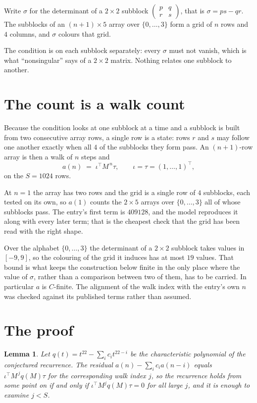 \documentclass[11pt,a4paper]{article}
\theoremstyle{plain}
\newtheorem{lemma}[theorem]{Lemma}
\theoremstyle{definition}
\begin{document}
Write $\sigma$ for the determinant of a $2\times2$ subblock
$\begin{pmatrix}p&q\\r&s\end{pmatrix}$, that is $\sigma=ps-qr$. The subblocks of an
$(n+1)\times5$ array over $\{0,\dots,3\}$ form a grid of $n$ rows and $4$
columns, and $\sigma$ colours that grid.

The condition is on each subblock separately: every $\sigma$ must not vanish, which is what
``nonsingular'' says of a $2\times2$ matrix. Nothing
relates one subblock to another.

\section{The count is a walk count}

Because the condition looks at one subblock at a time and a subblock is
built from two consecutive array rows, a single row is a state: rows $r$ and $s$ may follow one
another exactly when all $4$ of the subblocks they form pass. An $(n+1)$-row array is then a
walk of $n$ steps and
\[
a(n)\;=\;\iota^{\!\top}M^{\,n}\tau,\qquad\iota=\tau=(1,\dots,1)^{\!\top},
\]
on the $S=1024$ rows.

At $n=1$ the array has two rows and the grid is a single row of $4$
subblocks, each tested on its own, so $a(1)$ counts the
$2\times5$ arrays over $\{0,\dots,3\}$ all of whose subblocks pass. The entry's
first term is $409128$, and the model reproduces it along with every later term; that is the
cheapest check that the grid has been read with the right shape.

Over the alphabet $\{0,\dots,3\}$ the determinant of a $2\times2$ subblock takes values in
$[-9,9]$, so the colouring of the grid it induces has at most $19$ values.
That bound is what keeps the construction below finite in the only place where the value of
$\sigma$, rather than a comparison between two of them, has to be carried.
In particular $a$ is $C$-finite. The alignment of the walk index with the entry's own $n$ was
checked against its published terms rather than assumed.

\section{The proof}

\begin{lemma}\label{lem:crit}
Let $q(t)=t^{22}-\sum_i c_it^{22-i}$ be the characteristic polynomial of the
conjectured recurrence. The residual $a(n)-\sum_ic_ia(n-i)$ equals
$\iota^{\!\top}M^{\,j}q(M)\tau$ for the corresponding walk index $j$, so the recurrence
holds from some point on if and only if $\iota^{\!\top}M^{j}q(M)\tau=0$ for all large $j$,
and it is enough to examine $j<S$.
\end{lemma}
\end{document}
